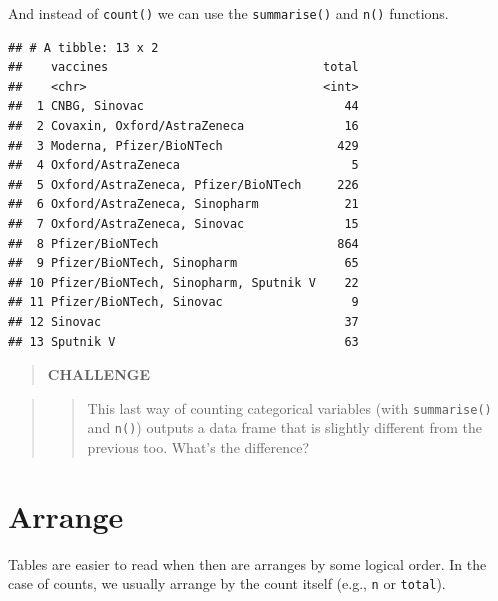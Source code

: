 \documentclass[
]{book}
\newenvironment{Shaded}{\begin{snugshade}}{\end{snugshade}}
\newcommand{\DataTypeTok}[1]{\textcolor[rgb]{0.13,0.29,0.53}{#1}}
\newcommand{\KeywordTok}[1]{\textcolor[rgb]{0.13,0.29,0.53}{\textbf{#1}}}
\newcommand{\NormalTok}[1]{#1}
\newcommand{\OperatorTok}[1]{\textcolor[rgb]{0.81,0.36,0.00}{\textbf{#1}}}
\newcommand{\StringTok}[1]{\textcolor[rgb]{0.31,0.60,0.02}{#1}}
\begin{document}
And instead of \texttt{count()} we can use the \texttt{summarise()} and \texttt{n()} functions.

\begin{Shaded}
\end{Shaded}

\begin{verbatim}
## # A tibble: 13 x 2
##    vaccines                              total
##    <chr>                                 <int>
##  1 CNBG, Sinovac                            44
##  2 Covaxin, Oxford/AstraZeneca              16
##  3 Moderna, Pfizer/BioNTech                429
##  4 Oxford/AstraZeneca                        5
##  5 Oxford/AstraZeneca, Pfizer/BioNTech     226
##  6 Oxford/AstraZeneca, Sinopharm            21
##  7 Oxford/AstraZeneca, Sinovac              15
##  8 Pfizer/BioNTech                         864
##  9 Pfizer/BioNTech, Sinopharm               65
## 10 Pfizer/BioNTech, Sinopharm, Sputnik V    22
## 11 Pfizer/BioNTech, Sinovac                  9
## 12 Sinovac                                  37
## 13 Sputnik V                                63
\end{verbatim}

\begin{quote}
\textbf{CHALLENGE}
\end{quote}

\begin{quote}
\begin{quote}
This last way of counting categorical variables (with \texttt{summarise()} and \texttt{n()}) outputs a data frame that is slightly different from the previous too. What's the difference?
\end{quote}
\end{quote}

\hypertarget{arrange}{%
\section{Arrange}\label{arrange}}

Tables are easier to read when then are arranges by some logical order. In the case of counts, we usually arrange by the count itself (e.g., \texttt{n} or \texttt{total}).
\end{document}
